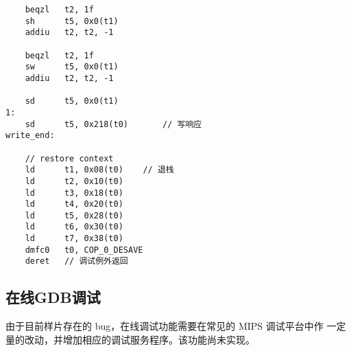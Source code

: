 \begin{lstlisting}
    beqzl   t2, 1f
    sh      t5, 0x0(t1)
    addiu   t2, t2, -1

    beqzl   t2, 1f
    sw      t5, 0x0(t1)
    addiu   t2, t2, -1

    sd      t5, 0x0(t1)
1:
    sd      t5, 0x218(t0)    	// 写响应
write_end:

    // restore context
    ld      t1, 0x08(t0)	// 退栈
    ld      t2, 0x10(t0)
    ld      t3, 0x18(t0)
    ld      t4, 0x20(t0)
    ld      t5, 0x28(t0)
    ld      t6, 0x30(t0)
    ld      t7, 0x38(t0)
    dmfc0   t0, COP_0_DESAVE
    deret	// 调试例外返回
\end{lstlisting}

\subsection{在线GDB调试}

由于目前样片存在的 bug，在线调试功能需要在常见的 MIPS 调试平台中作
一定量的改动，并增加相应的调试服务程序。该功能尚未实现。

